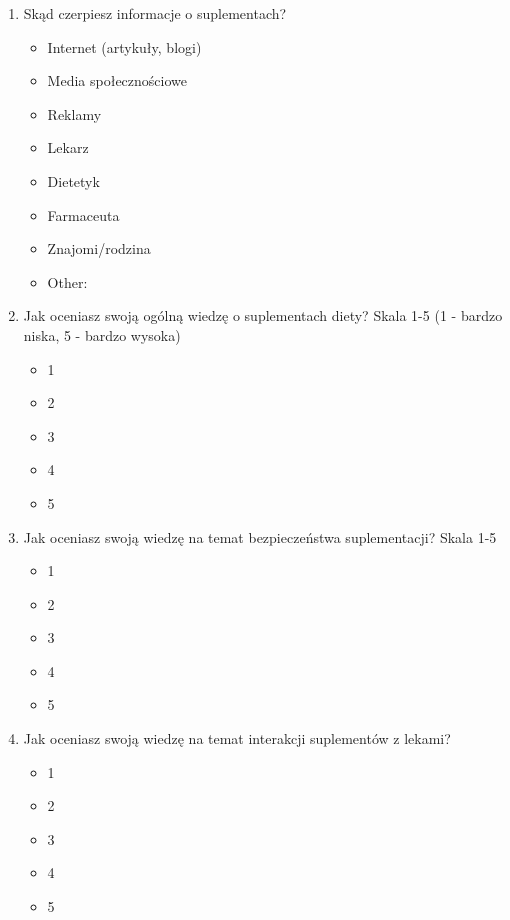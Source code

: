 \documentclass[a4paper, 12pt, oneside]{article}
\begin{document}
\begin{enumerate}
    \item Skąd czerpiesz informacje o suplementach?
    \begin{itemize}
        \item Internet (artykuły, blogi)
        \item Media społecznościowe
        \item Reklamy
        \item Lekarz
        \item Dietetyk
        \item Farmaceuta
        \item Znajomi/rodzina
        \item Other:
    \end{itemize}

    \item Jak oceniasz swoją ogólną wiedzę o suplementach diety? Skala 1-5 (1 - bardzo niska, 5 - bardzo wysoka)
    \begin{itemize}
        \item 1
        \item 2
        \item 3
        \item 4
        \item 5
    \end{itemize}

    \item Jak oceniasz swoją wiedzę na temat bezpieczeństwa suplementacji? Skala 1-5
    \begin{itemize}
        \item 1
        \item 2
        \item 3
        \item 4
        \item 5
    \end{itemize}

    \item Jak oceniasz swoją wiedzę na temat interakcji suplementów z lekami?
    \begin{itemize}
        \item 1
        \item 2
        \item 3
        \item 4
        \item 5
    \end{itemize}


\end{enumerate}
\end{document}
